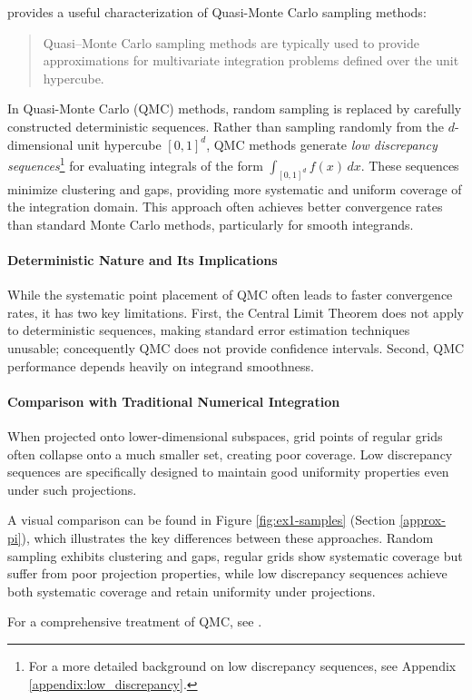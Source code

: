 \cite{lemieux_monte_2009} provides a useful characterization of Quasi-Monte Carlo sampling methods:
\begin{quote}
Quasi–Monte Carlo sampling methods are typically used to provide approximations
for multivariate integration problems defined over the unit hypercube.
\end{quote}

In Quasi-Monte Carlo (QMC) methods, random sampling is replaced by carefully constructed deterministic sequences.
Rather than sampling randomly from the $d$-dimensional unit hypercube $[0,1]^d$, QMC methods generate \textit{low discrepancy sequences}\footnote{For a more detailed background on low discrepancy sequences, see Appendix \ref{appendix:low_discrepancy}.} for evaluating integrals of the form $\int_{[0,1]^d} f(x) \,dx$. These sequences minimize clustering and gaps, providing more systematic and uniform coverage of the integration domain.
This approach often achieves better convergence rates than standard Monte Carlo methods, particularly for smooth integrands.


\paragraph{Deterministic Nature and Its Implications}
While the systematic point placement of QMC often leads to faster convergence rates, it has two key limitations. First, the Central Limit Theorem does not apply to deterministic sequences, making standard error estimation techniques unusable; concequently QMC does not provide confidence intervals. Second, QMC performance depends heavily on integrand smoothness.

\paragraph{Comparison with Traditional Numerical Integration}
When projected onto lower-dimensional subspaces, grid points of regular grids often collapse onto a much smaller set, creating poor coverage. Low discrepancy sequences are specifically designed to maintain good uniformity properties even under such projections.

A visual comparison can be found in Figure \ref{fig:ex1-samples} (Section \ref{approx-pi}), which illustrates the key differences between these approaches. Random sampling exhibits clustering and gaps, regular grids show systematic coverage but suffer from poor projection properties, while low discrepancy sequences achieve both systematic coverage and retain uniformity under projections.

For a comprehensive treatment of QMC, see \cite{owen_practical_2023}.